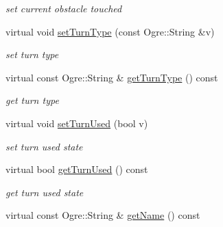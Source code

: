 \begin{DoxyCompactItemize}
\begin{DoxyCompactList}\small\item\em set current obstacle touched \end{DoxyCompactList}\item 
virtual void \hyperlink{class_n_c_t_u_1_1_obstacle_aa062441e739d95d31f5f8489229d86ca}{set\+Turn\+Type} (const Ogre\+::\+String \&v)\hypertarget{class_n_c_t_u_1_1_obstacle_aa062441e739d95d31f5f8489229d86ca}{}\label{class_n_c_t_u_1_1_obstacle_aa062441e739d95d31f5f8489229d86ca}

\begin{DoxyCompactList}\small\item\em set turn type \end{DoxyCompactList}\item 
virtual const Ogre\+::\+String \& \hyperlink{class_n_c_t_u_1_1_obstacle_ad67378fa3bac4797e8028388021859aa}{get\+Turn\+Type} () const \hypertarget{class_n_c_t_u_1_1_obstacle_ad67378fa3bac4797e8028388021859aa}{}\label{class_n_c_t_u_1_1_obstacle_ad67378fa3bac4797e8028388021859aa}

\begin{DoxyCompactList}\small\item\em get turn type \end{DoxyCompactList}\item 
virtual void \hyperlink{class_n_c_t_u_1_1_obstacle_a5024c55cbbe88f55e811f6d8f79f63c1}{set\+Turn\+Used} (bool v)\hypertarget{class_n_c_t_u_1_1_obstacle_a5024c55cbbe88f55e811f6d8f79f63c1}{}\label{class_n_c_t_u_1_1_obstacle_a5024c55cbbe88f55e811f6d8f79f63c1}

\begin{DoxyCompactList}\small\item\em set turn used state \end{DoxyCompactList}\item 
virtual bool \hyperlink{class_n_c_t_u_1_1_obstacle_a529732a75d861258223e9389e555d138}{get\+Turn\+Used} () const \hypertarget{class_n_c_t_u_1_1_obstacle_a529732a75d861258223e9389e555d138}{}\label{class_n_c_t_u_1_1_obstacle_a529732a75d861258223e9389e555d138}

\begin{DoxyCompactList}\small\item\em get turn used state \end{DoxyCompactList}\item 
virtual const Ogre\+::\+String \& \hyperlink{class_n_c_t_u_1_1_obstacle_a08a8a4b08b58a763328511e38a5ee507}{get\+Name} () const \hypertarget{class_n_c_t_u_1_1_obstacle_a08a8a4b08b58a763328511e38a5ee507}{}\label{class_n_c_t_u_1_1_obstacle_a08a8a4b08b58a763328511e38a5ee507}


\end{DoxyCompactItemize}
